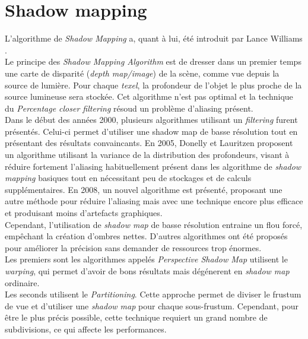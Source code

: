 \documentclass[a4paper,10pt]{report}
\begin{document}
\section{Shadow mapping}

L'algorithme de \textit{Shadow Mapping} a, quant à lui, été introduit par Lance Williams \cite{williams1978casting}.
\\

Le principe des \textit{Shadow Mapping Algorithm} est de dresser dans un premier temps une carte de disparité (\textit{depth map/image}) de la scène, comme vue depuis la source de lumière. Pour chaque \textit{texel}, la profondeur de l'objet le plus proche de la source lumineuse sera stockée. Cet algorithme n'est pas optimal et la technique du \textit{Percentage closer filtering}\cite{reeves1987rendering,fernando2005percentage} résoud un problème d'aliasing présent.
\\

Dans le début des années 2000, plusieurs algorithmes utilisant un \textit{filtering} furent présentés. Celui-ci permet d'utiliser une shadow map de basse résolution tout en présentant des résultats convaincants. En 2005, Donelly et Lauritzen \cite{donnelly2006variance} proposent un algorithme utilisant la variance de la distribution des profondeurs, visant à réduire fortement l'aliasing habituellement présent dans les algorithme de \textit{shadow mapping} basiques tout en nécessitant peu de stockages et de calculs supplémentaires. En 2008, un nouvel algorithme est présenté\cite{annen2008exponential}, proposant une autre méthode pour réduire l'aliasing mais avec une technique encore plus efficace et produisant moins d'artefacts graphiques. 
\\

Cependant, l'utilisation de \textit{shadow map} de basse résolution entraine un flou forcé, empêchant la création d'ombres nettes. D'autres algorithmes ont été proposés pour améliorer la précision sans demander de ressources trop énormes. 
\\

Les premiers sont les algorithmes appelés \textit{Perspective Shadow Map}\cite{wimmer2004light,stamminger2002perspective,lloyd2008logarithmic} utilisent le \textit{warping}, qui permet d'avoir de bons résultats mais dégénerent en \textit{shadow map} ordinaire.
\\

Les seconds utilisent le \textit{Partitioning}. Cette approche permet de diviser le frustum de vue et d'utiliser une \textit{shadow map} pour chaque sous-frustum. Cependant, pour être le plus précis possible, cette technique requiert un grand nombre de subdivisions, ce qui affecte les performances.
\\
\end{document}
